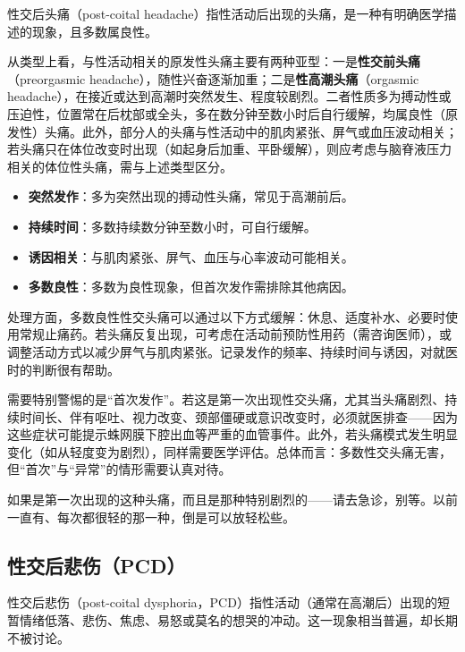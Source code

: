 \documentclass[12pt,UTF8]{ctexbook}
\newcommand{\keyword}[1]{\textbf{#1}}
\begin{document}
性交后头痛（post-coital headache）指性活动后出现的头痛，是一种有明确医学描述的现象，且多数属良性。

从类型上看，与性活动相关的原发性头痛主要有两种亚型：一是\keyword{性交前头痛}（preorgasmic headache），随性兴奋逐渐加重；二是\keyword{性高潮头痛}（orgasmic headache），在接近或达到高潮时突然发生、程度较剧烈。二者性质多为搏动性或压迫性，位置常在后枕部或全头，多在数分钟至数小时后自行缓解，均属良性（原发性）头痛。此外，部分人的头痛与性活动中的肌肉紧张、屏气或血压波动相关；若头痛只在体位改变时出现（如起身后加重、平卧缓解），则应考虑与脑脊液压力相关的体位性头痛，需与上述类型区分。

\begin{itemize}
	\item \textbf{突然发作}：多为突然出现的搏动性头痛，常见于高潮前后。
	\item \textbf{持续时间}：多数持续数分钟至数小时，可自行缓解。
	\item \textbf{诱因相关}：与肌肉紧张、屏气、血压与心率波动可能相关。
	\item \textbf{多数良性}：多数为良性现象，但首次发作需排除其他病因。
\end{itemize}

处理方面，多数良性性交头痛可以通过以下方式缓解：休息、适度补水、必要时使用常规止痛药。若头痛反复出现，可考虑在活动前预防性用药（需咨询医师），或调整活动方式以减少屏气与肌肉紧张。记录发作的频率、持续时间与诱因，对就医时的判断很有帮助。

需要特别警惕的是“首次发作”。若这是第一次出现性交头痛，尤其当头痛剧烈、持续时间长、伴有呕吐、视力改变、颈部僵硬或意识改变时，必须就医排查——因为这些症状可能提示蛛网膜下腔出血等严重的血管事件。此外，若头痛模式发生明显变化（如从轻度变为剧烈），同样需要医学评估。总体而言：多数性交头痛无害，但“首次”与“异常”的情形需要认真对待。

\begin{tcolorbox}[colback=pink!5!white,colframe=red!50!black,title=贴心小叮咛]
	如果是第一次出现的这种头痛，而且是那种特别剧烈的——请去急诊，别等。以前一直有、每次都很轻的那一种，倒是可以放轻松些。
\end{tcolorbox}

\subsection{性交后悲伤（PCD）}

性交后悲伤（post-coital dysphoria，PCD）指性活动（通常在高潮后）出现的短暂情绪低落、悲伤、焦虑、易怒或莫名的想哭的冲动。这一现象相当普遍，却长期不被讨论。
\end{document}
